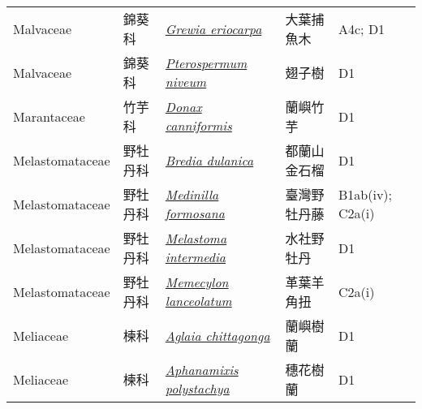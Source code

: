 {\begin{longtable}{L{2.5cm}L{2cm}L{5cm}L{2.5cm}L{3cm}}
    Malvaceae & 錦葵科 & \href{http://www.theplantlist.org/tpl1.1/search?q=Grewia+eriocarpa}{\textit{Grewia eriocarpa} } & 大葉捕魚木 & A4c; D1    \\
    Malvaceae & 錦葵科 & \href{http://www.theplantlist.org/tpl1.1/search?q=Pterospermum+niveum}{\textit{Pterospermum niveum} } & 翅子樹 & D1    \\
    Marantaceae & 竹芋科 & \href{http://www.theplantlist.org/tpl1.1/search?q=Donax+canniformis}{\textit{Donax canniformis} } & 蘭嶼竹芋 & D1    \\
    Melastomataceae & 野牡丹科 & \href{http://www.theplantlist.org/tpl1.1/search?q=Bredia+dulanica}{\textit{Bredia dulanica} } & 都蘭山金石榴 & D1    \\
    Melastomataceae & 野牡丹科 & \href{http://www.theplantlist.org/tpl1.1/search?q=Medinilla+formosana}{\textit{Medinilla formosana} } & 臺灣野牡丹藤 & B1ab(iv); C2a(i)    \\
    Melastomataceae & 野牡丹科 & \href{http://www.theplantlist.org/tpl1.1/search?q=Melastoma+intermedia}{\textit{Melastoma intermedia} } & 水社野牡丹 & D1    \\
    Melastomataceae & 野牡丹科 & \href{http://www.theplantlist.org/tpl1.1/search?q=Memecylon+lanceolatum}{\textit{Memecylon lanceolatum} } & 革葉羊角扭 & C2a(i)    \\
    Meliaceae & 楝科 & \href{http://www.theplantlist.org/tpl1.1/search?q=Aglaia+chittagonga}{\textit{Aglaia chittagonga} } & 蘭嶼樹蘭 & D1    \\
    Meliaceae & 楝科 & \href{http://www.theplantlist.org/tpl1.1/search?q=Aphanamixis+polystachya}{\textit{Aphanamixis polystachya} } & 穗花樹蘭 & D1    \\

\end{longtable}}
